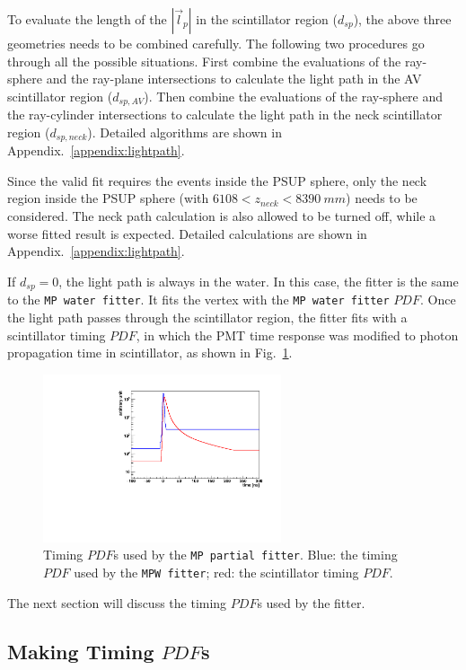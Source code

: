 To evaluate the length of the $|\vec{l}_p|$ in the scintillator region ($d_{sp}$), the above three geometries needs to be combined carefully. The following two procedures go through all the possible situations. First combine the evaluations of the ray-sphere and the ray-plane intersections to calculate the light path in the AV scintillator region ($d_{sp,AV}$). Then combine the evaluations of the ray-sphere and the ray-cylinder intersections to calculate the light path in the neck scintillator region ($d_{sp,neck}$). Detailed algorithms are shown in Appendix.~\ref{appendix:lightpath}.

Since the valid fit requires the events inside the PSUP sphere, only the neck region inside the PSUP sphere (with $6108<z_{neck}<8390~mm$) needs to be considered. The neck path calculation is also allowed to be turned off, while a worse fitted result is expected. Detailed calculations are shown in Appendix.~\ref{appendix:lightpath}.

If $d_{sp}=0$, the light path is always in the water. In this case, the fitter is the same to the \texttt{MP water fitter}. It fits the vertex with the \texttt{MP water fitter} $PDF$. Once the light path passes through the scintillator region, the fitter fits with a scintillator timing $PDF$, in which the PMT time response was modified to photon propagation time in scintillator, as shown in Fig.~\ref{partialpdf}.

\begin{figure}[htbp]
	\centering	
	\includegraphics[width=7cm]{scintpdf.pdf}
	\caption[Timing $PDF$s used by the \texttt{MP partial fitter}.]{Timing $PDF$s used by the \texttt{MP partial fitter}. Blue: the timing $PDF$ used by the \texttt{MPW fitter}; red: the scintillator timing $PDF$.}
	\label{partialpdf}
\end{figure}

The next section will discuss the timing $PDF$s used by the fitter.

\subsection{Making Timing $PDF$s}

